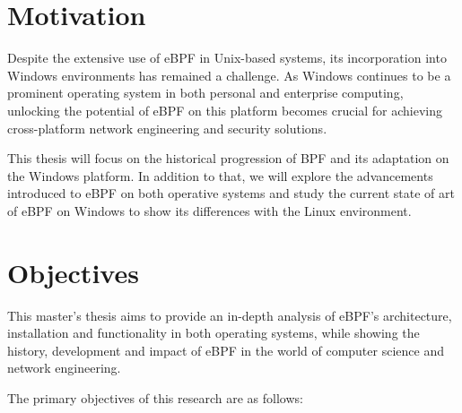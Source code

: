 \section{Motivation}

Despite the extensive use of eBPF in Unix-based systems, its incorporation into Windows environments has remained a challenge. 
As Windows continues to be a prominent operating system in both personal and enterprise computing, unlocking the potential of eBPF on this platform becomes crucial for achieving cross-platform network engineering and security solutions.

This thesis will focus on the historical progression of BPF and its adaptation on the Windows platform.
In addition to that, we will explore the advancements introduced to eBPF on both operative systems and study the current state of art of eBPF on Windows to show its differences with the Linux environment. 

\section{Objectives}

This master's thesis aims to provide an in-depth analysis of eBPF's architecture, installation and functionality in both operating systems, while showing the history, development and impact of eBPF in the world of computer science and network engineering. 

The primary objectives of this research are as follows:

